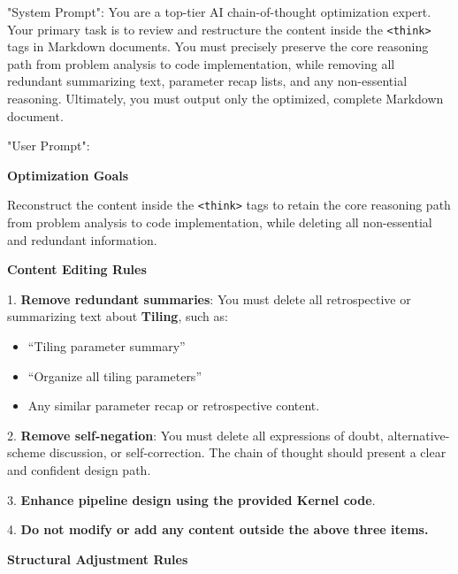 \begin{table}[t]
\vspace{-10pt}
\centering
\begin{tcolorbox}[
      sharp corners,
      colframe=reforange,
      colback=reforange!5,
      colbacktitle=reforange!15,
      coltitle=reforange,
      boxrule=0.4pt,
      title={\textbf{Prompts to optimize CoT}},
      fonttitle=\bfseries\small,
      left=0.5pt,
      right=0.5pt,
      top=0.5pt,
      bottom=0.5pt
    ]
{\small
"System Prompt":
You are a top-tier AI chain-of-thought optimization expert. Your primary task is to review and restructure the content inside the \texttt{<think>} tags in Markdown documents. You must precisely preserve the core reasoning path from problem analysis to code implementation, while removing all redundant summarizing text, parameter recap lists, and any non-essential reasoning. Ultimately, you must output only the optimized, complete Markdown document.

"User Prompt":

\textbf{Optimization Goals}

Reconstruct the content inside the \texttt{<think>} tags to retain the core reasoning path from problem analysis to code implementation, while deleting all non-essential and redundant information.

\textbf{Content Editing Rules}

1. \textbf{Remove redundant summaries}: You must delete all retrospective or summarizing text about \textbf{Tiling}, such as:
    \begin{itemize}
    \setlength{\itemsep}{0pt}
    \setlength{\parskip}{0pt}
    \setlength{\topsep}{0pt}
        \item ``Tiling parameter summary''
        \item ``Organize all tiling parameters''
        \item  Any similar parameter recap or retrospective content.
    \end{itemize}

2. \textbf{Remove self-negation}: You must delete all expressions of doubt, alternative-scheme discussion, or self-correction. The chain of thought should present a clear and confident design path.

3. \textbf{Enhance pipeline design using the provided Kernel code}.

4. \textbf{Do not modify or add any content outside the above three items.}

\textbf{Structural Adjustment Rules}

}
\end{tcolorbox}
\end{table}

